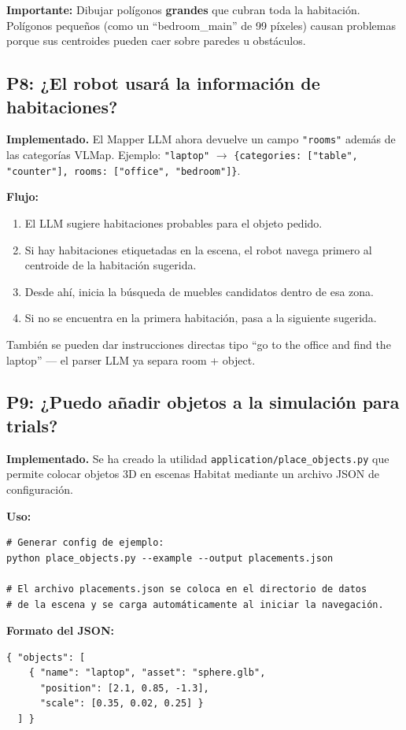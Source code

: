 \documentclass[11pt,a4paper]{article}
\begin{document}
\textbf{Importante:} Dibujar polígonos \textbf{grandes} que cubran toda la habitación. Polígonos pequeños (como un ``bedroom\_main'' de 99 píxeles) causan problemas porque sus centroides pueden caer sobre paredes u obstáculos.

\subsection{P8: ¿El robot usará la información de habitaciones?}

\textbf{Implementado.} El Mapper LLM ahora devuelve un campo \texttt{"rooms"} además de las categorías VLMap. Ejemplo: \texttt{"laptop"} $\rightarrow$ \texttt{\{categories: ["table", "counter"], rooms: ["office", "bedroom"]\}}.

\textbf{Flujo:}
\begin{enumerate}
    \item El LLM sugiere habitaciones probables para el objeto pedido.
    \item Si hay habitaciones etiquetadas en la escena, el robot navega primero al centroide de la habitación sugerida.
    \item Desde ahí, inicia la búsqueda de muebles candidatos dentro de esa zona.
    \item Si no se encuentra en la primera habitación, pasa a la siguiente sugerida.
\end{enumerate}

También se pueden dar instrucciones directas tipo ``go to the office and find the laptop'' --- el parser LLM ya separa room + object.

\subsection{P9: ¿Puedo añadir objetos a la simulación para trials?}

\textbf{Implementado.} Se ha creado la utilidad \texttt{application/place\_objects.py} que permite colocar objetos 3D en escenas Habitat mediante un archivo JSON de configuración.

\textbf{Uso:}
\begin{verbatim}
# Generar config de ejemplo:
python place_objects.py --example --output placements.json

# El archivo placements.json se coloca en el directorio de datos
# de la escena y se carga automáticamente al iniciar la navegación.
\end{verbatim}

\textbf{Formato del JSON:}
\begin{verbatim}
{ "objects": [
    { "name": "laptop", "asset": "sphere.glb",
      "position": [2.1, 0.85, -1.3],
      "scale": [0.35, 0.02, 0.25] }
  ] }
\end{verbatim}
\end{document}
